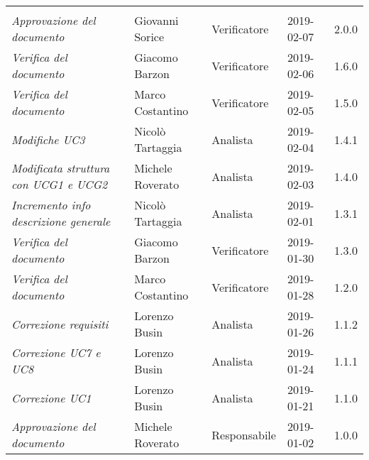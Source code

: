 \newpage 
\section*{}
	\begin{longtable}{p{4cm}|C{3cm}|C{3cm}|R{2.5cm}|R{2cm}}
	
	 & & & & \\
	\endhead
	
		\emph{Approvazione del documento} & Giovanni Sorice & Verificatore & 2019-02-07 & 2.0.0 \\
		\hline
	
		\emph{Verifica del documento} & Giacomo Barzon & Verificatore & 2019-02-06 & 1.6.0 \\
		\hline
		
		\emph{Verifica del documento} & Marco Costantino & Verificatore & 2019-02-05 & 1.5.0 \\
		\hline
	
		\emph{Modifiche UC3} & Nicolò Tartaggia & Analista & 2019-02-04 & 1.4.1 \\
		\hline
	
		\emph{Modificata struttura con UCG1 e UCG2} & Michele Roverato & Analista & 2019-02-03 & 1.4.0 \\
		\hline
	
		\emph{Incremento info descrizione generale} & Nicolò Tartaggia & Analista & 2019-02-01 & 1.3.1 \\
		\hline
	
		\emph{Verifica del documento} & Giacomo Barzon & Verificatore & 2019-01-30 & 1.3.0 \\
		\hline
		
		\emph{Verifica del documento} & Marco Costantino & Verificatore & 2019-01-28 & 1.2.0 \\
		\hline
	
		\emph{Correzione requisiti} & Lorenzo Busin & Analista & 2019-01-26 & 1.1.2 \\
		\hline
	
		\emph{Correzione UC7 e UC8} & Lorenzo Busin & Analista & 2019-01-24 & 1.1.1 \\
		\hline	
	
		\emph{Correzione UC1} & Lorenzo Busin & Analista & 2019-01-21 & 1.1.0 \\
		\hline
		
		\emph{Approvazione del documento} & Michele Roverato & Responsabile & 2019-01-02 & 1.0.0 \\
		\hline
		

\end{longtable}
